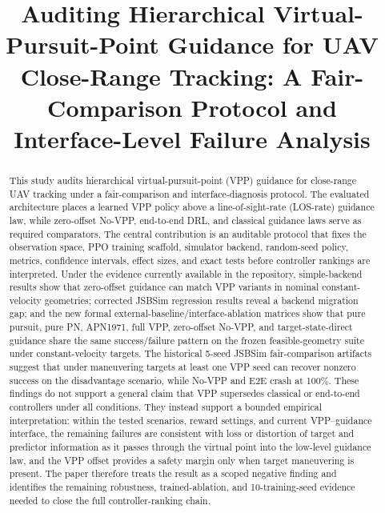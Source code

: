 \documentclass[conference]{IEEEtran}
\begin{document}
\title{Auditing Hierarchical Virtual-Pursuit-Point Guidance for UAV Close-Range Tracking: A Fair-Comparison Protocol and Interface-Level Failure Analysis}

\author{}

\maketitle

\begin{abstract}
This study audits hierarchical virtual-pursuit-point (VPP) guidance for close-range UAV tracking under a fair-comparison and interface-diagnosis protocol. The evaluated architecture places a learned VPP policy above a line-of-sight-rate (LOS-rate) guidance law, while zero-offset No-VPP, end-to-end DRL, and classical guidance laws serve as required comparators. The central contribution is an auditable protocol that fixes the observation space, PPO training scaffold, simulator backend, random-seed policy, metrics, confidence intervals, effect sizes, and exact tests before controller rankings are interpreted. Under the evidence currently available in the repository, simple-backend results show that zero-offset guidance can match VPP variants in nominal constant-velocity geometries; corrected JSBSim regression results reveal a backend migration gap; and the new formal external-baseline/interface-ablation matrices show that pure pursuit, pure PN, APN1971, full VPP, zero-offset No-VPP, and target-state-direct guidance share the same success/failure pattern on the frozen feasible-geometry suite under constant-velocity targets. The historical 5-seed JSBSim fair-comparison artifacts suggest that under maneuvering targets at least one VPP seed can recover nonzero success on the disadvantage scenario, while No-VPP and E2E crash at 100\%. These findings do not support a general claim that VPP supersedes classical or end-to-end controllers under all conditions. They instead support a bounded empirical interpretation: within the tested scenarios, reward settings, and current VPP--guidance interface, the remaining failures are consistent with loss or distortion of target and predictor information as it passes through the virtual point into the low-level guidance law, and the VPP offset provides a safety margin only when target maneuvering is present. The paper therefore treats the result as a scoped negative finding and identifies the remaining robustness, trained-ablation, and 10-training-seed evidence needed to close the full controller-ranking chain.
\end{abstract}
\end{document}
